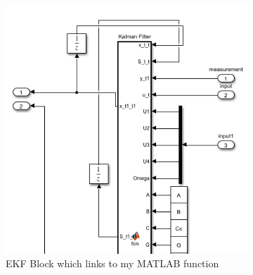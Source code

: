 \documentclass[conf]{new-aiaa}
\begin{document}
\begin{doublespace}
\begin{figure}[!h]
\centering
\begin{subfigure}{.33\textwidth}
  \centering
  \includegraphics[scale= 0.4]{EKF.png}
  \caption{EKF Block which links to my MATLAB function}
  \label{EKF}
\end{subfigure}%
\begin{subfigure}{.33\textwidth}
  \centering

\end{subfigure}
\end{figure}
\end{doublespace}
\end{document}
